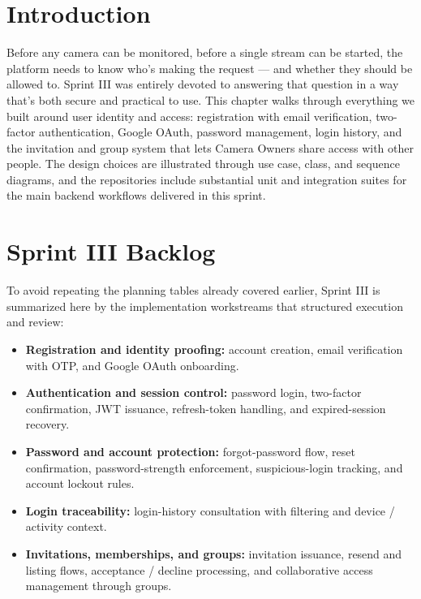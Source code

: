\documentclass[12pt,a4paper,oneside]{report}
\begin{document}
\section{Introduction}
\label{sec:s3_intro}

\hspace{0.8cm}Before any camera can be monitored, before a single stream can be started, the platform needs to know who's making the request --- and whether they should be allowed to. Sprint III was entirely devoted to answering that question in a way that's both secure and practical to use. This chapter walks through everything we built around user identity and access: registration with email verification, two-factor authentication, Google OAuth, password management, login history, and the invitation and group system that lets Camera Owners share access with other people. The design choices are illustrated through use case, class, and sequence diagrams, and the repositories include substantial unit and integration suites for the main backend workflows delivered in this sprint.

\section{Sprint III Backlog}
\label{sec:s3_backlog}

\hspace{0.8cm}To avoid repeating the planning tables already covered earlier, Sprint III is summarized here by the implementation workstreams that structured execution and review:

\begin{itemize}[leftmargin=1.2cm]
  \item \textbf{Registration and identity proofing:} account creation, email verification with OTP, and Google OAuth onboarding.
  \item \textbf{Authentication and session control:} password login, two-factor confirmation, JWT issuance, refresh-token handling, and expired-session recovery.
  \item \textbf{Password and account protection:} forgot-password flow, reset confirmation, password-strength enforcement, suspicious-login tracking, and account lockout rules.
  \item \textbf{Login traceability:} login-history consultation with filtering and device / activity context.
  \item \textbf{Invitations, memberships, and groups:} invitation issuance, resend and listing flows, acceptance / decline processing, and collaborative access management through groups.
\end{itemize}
\end{document}
